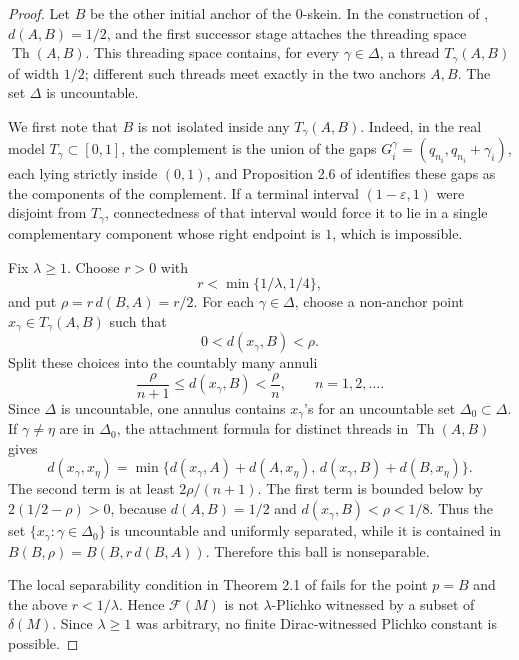 \documentclass[11pt]{article}
\begin{document}
\begin{proof}
Let \(B\) be the other initial anchor of the \(0\)-skein.  In the construction
of \cite{HQ22}, \(d(A,B)=1/2\), and the first successor stage attaches the
threading space \(\operatorname{Th}(A,B)\).  This threading space contains,
for every \(\gamma\in\Delta\), a thread \(T_\gamma(A,B)\) of width \(1/2\);
different such threads meet exactly in the two anchors \(A,B\).  The set
\(\Delta\) is uncountable.

We first note that \(B\) is not isolated inside any \(T_\gamma(A,B)\).  Indeed,
in the real model \(T_\gamma\subset[0,1]\), the complement is the union of the
gaps \(G_i^\gamma=(q_{n_i},q_{n_i}+\gamma_i)\), each lying strictly inside
\((0,1)\), and Proposition 2.6 of \cite{HQ22} identifies these gaps as the
components of the complement.  If a terminal interval \((1-\varepsilon,1)\)
were disjoint from \(T_\gamma\), connectedness of that interval would force it
to lie in a single complementary component whose right endpoint is \(1\), which
is impossible.

Fix \(\lambda\geq 1\).  Choose \(r>0\) with
\[
        r<\min\{1/\lambda,1/4\},
\]
and put \(\rho=r\,d(B,A)=r/2\).  For each \(\gamma\in\Delta\), choose a
non-anchor point \(x_\gamma\in T_\gamma(A,B)\) such that
\[
        0<d(x_\gamma,B)<\rho .
\]
Split these choices into the countably many annuli
\[
        \frac{\rho}{n+1}\leq d(x_\gamma,B)<\frac{\rho}{n},
        \qquad n=1,2,\ldots .
\]
Since \(\Delta\) is uncountable, one annulus contains \(x_\gamma\)'s for an
uncountable set \(\Delta_0\subset\Delta\).  If \(\gamma\neq\eta\) are in
\(\Delta_0\), the attachment formula for distinct threads in
\(\operatorname{Th}(A,B)\) gives
\[
 d(x_\gamma,x_\eta)
 =\min\{d(x_\gamma,A)+d(A,x_\eta),\,
        d(x_\gamma,B)+d(B,x_\eta)\}.
\]
The second term is at least \(2\rho/(n+1)\).  The first term is bounded below
by \(2(1/2-\rho)>0\), because \(d(A,B)=1/2\) and \(d(x_\gamma,B)<\rho<1/8\).
Thus the set \(\{x_\gamma:\gamma\in\Delta_0\}\) is uncountable and uniformly
separated, while it is contained in \(B(B,\rho)=B(B,r\,d(B,A))\).  Therefore
this ball is nonseparable.

The local separability condition in Theorem 2.1 of \cite{GMQ23} fails for the
point \(p=B\) and the above \(r<1/\lambda\).  Hence \(\mathcal F(M)\) is not
\(\lambda\)-Plichko witnessed by a subset of \(\delta(M)\).  Since
\(\lambda\geq 1\) was arbitrary, no finite Dirac-witnessed Plichko constant is
possible.
\end{proof}
\end{document}
